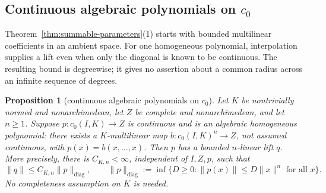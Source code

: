\documentclass[11pt]{amsart}
\newtheorem{proposition}[theorem]{Proposition}
\theoremstyle{definition}
\theoremstyle{remark}
\numberwithin{equation}{section}
\newcommand{\norm}[1]{\lVert #1\rVert}
\theoremstyle{plain}
\theoremstyle{definition}
\theoremstyle{plain}
\begin{document}
\subsection{Continuous algebraic polynomials on \texorpdfstring{$c_0$}{c0}}
Theorem~\ref{thm:summable-parameters}(1) starts with bounded multilinear coefficients in an ambient space. For one
homogeneous polynomial, interpolation supplies a lift even when only the diagonal is known to be
continuous. The resulting bound is degreewise; it gives no assertion about a common radius across
an infinite sequence of degrees.

\begin{proposition}[continuous algebraic polynomials on $c_0$]\label{fam:prop:c0-algebraic}
Let $K$ be nontrivially normed and nonarchimedean, let $Z$ be complete and nonarchimedean, and let
$n\ge1$. Suppose $p\colon c_0(I,K)\to Z$ is continuous and is an algebraic homogeneous polynomial:
there exists a $K$\nobreakdash-multilinear map $b\colon c_0(I,K)^n\to Z$, not assumed continuous,
with $p(x)=b(x,\ldots,x)$. Then $p$ has a bounded $n$\nobreakdash-linear lift $q$. More precisely,
there is $C_{K,n}<\infty$, independent of $I,Z,p$, such that
\[
 \norm q\le C_{K,n}\norm p_{\mathrm{diag}},\qquad
 \norm p_{\mathrm{diag}}:=\inf\{D\ge0:\norm{p(x)}\le D\norm x^n\text{ for all }x\}.
\]
No completeness assumption on $K$ is needed.
\end{proposition}
\end{document}
